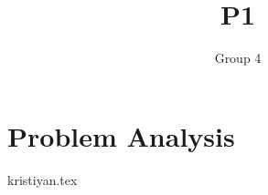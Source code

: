 \documentclass[11pt]{report}
\title{P1}
\author{Group 4}
\begin{document}
    \maketitle

    \chapter{Problem Analysis}

    {kristiyan.tex}

    \newpage
    
    
\end{document}

